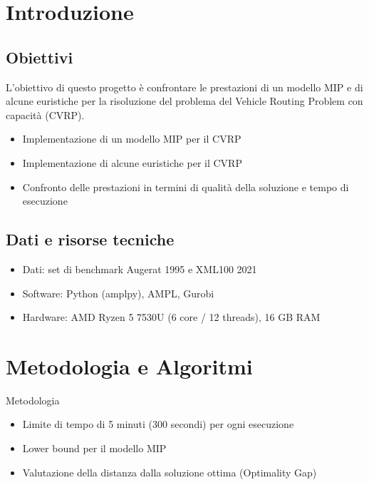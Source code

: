 \documentclass[compress]{beamer}
\begin{document}
\begin{frame}[plain]
	\titlepage
\end{frame}
\section{Introduzione}

\subsection{Obiettivi}
\begin{frame}{\subsecname}
    L'obiettivo di questo progetto è confrontare le prestazioni di un modello MIP e di alcune euristiche per la risoluzione del problema del Vehicle Routing Problem con capacità (CVRP).

    \begin{itemize}
        \item Implementazione di un modello MIP per il CVRP
        \item Implementazione di alcune euristiche per il CVRP
        \item Confronto delle prestazioni in termini di qualità della soluzione e tempo di esecuzione
    \end{itemize}
\end{frame}

\subsection{Dati e risorse tecniche}
\begin{frame}{\subsecname}
    \begin{itemize}
        \item Dati: set di benchmark Augerat 1995 e XML100 2021
        \item Software: Python (amplpy), AMPL, Gurobi
        \item Hardware: AMD Ryzen 5 7530U (6 core / 12 threads), 16 GB RAM
    \end{itemize}
\end{frame}

\section{Metodologia e Algoritmi}

\begin{frame}{Metodologia}
    \begin{itemize}
        \item Limite di tempo di 5 minuti (300 secondi) per ogni esecuzione
        \item Lower bound per il modello MIP
        \item Valutazione della distanza dalla soluzione ottima (Optimality Gap)
    \end{itemize}
\end{frame}
\end{document}
